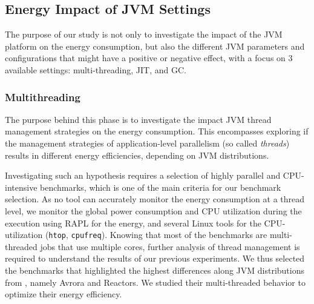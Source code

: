 \subsection{Energy Impact of JVM Settings}
The purpose of our study is not only to investigate the impact of the JVM platform on the energy consumption, but also the different JVM parameters and configurations that might have a positive or negative effect, with a focus on 3 available settings: multi-threading, JIT, and GC.

\subsubsection{Multithreading}
The purpose behind this phase is to investigate the impact JVM thread management strategies on the energy consumption.
This encompasses exploring if the management strategies of application-level parallelism (so called \emph{threads}) results in different energy efficiencies, depending on JVM distributions.

Investigating such an hypothesis requires a selection of highly parallel and CPU-intensive benchmarks, which is one of the main criteria for our benchmark selection.
As no tool can accurately monitor the energy consumption at a thread level, we monitor the global power consumption and CPU utilization during the execution using RAPL for the energy, and several Linux tools for the CPU-utilization (\texttt{htop}, \texttt{cpufreq}).
Knowing that most of the benchmarks are multi-threaded jobs that use multiple cores, further analysis of thread management is required to understand the results of our previous experiments.
We thus selected the benchmarks that highlighted the highest differences along JVM distributions from , namely \textsf{Avrora} and \textsf{Reactors}.
We studied their multi-threaded behavior to optimize their energy efficiency.

